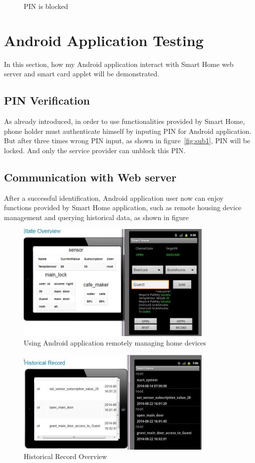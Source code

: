 \begin{figure}[!htb]
\begin{minipage}{0.49\linewidth}
  \caption{PIN is blocked}
  \label{fig:sub2}
\end{minipage}
  \end{figure}
\section{Android Application Testing}
In this section, how my Android application interact with Smart Home web server and smart card applet will be demonstrated.

\subsection{PIN Verification}

As already introduced, in order to use functionalities provided by Smart Home, phone holder must authenticate himself by inputing PIN for Android application. But after three times wrong PIN input, as shown in figure~\ref{fig:sub1}, PIN will be locked. And only the service provider can unblock this PIN. 
\subsection{Communication with Web server}
After a successful identification, Android application user now can enjoy functions provided by Smart Home application, such as remote housing device management and querying historical data, as shown in figure

\begin{figure}[!htb]
	\centering
	\includegraphics[width=0.85\textwidth]{Images/impl/housing-device.jpg}
		\caption{Using Android application remotely managing home devices}
	\label{fig:housing-device}
\end{figure}

\begin{figure}[!htb]
	\centering
	\includegraphics[width=0.85\textwidth]{Images/impl/record-query.jpg}
		\caption{Historical Record Overview}
	\label{fig:record-query}
\end{figure}
